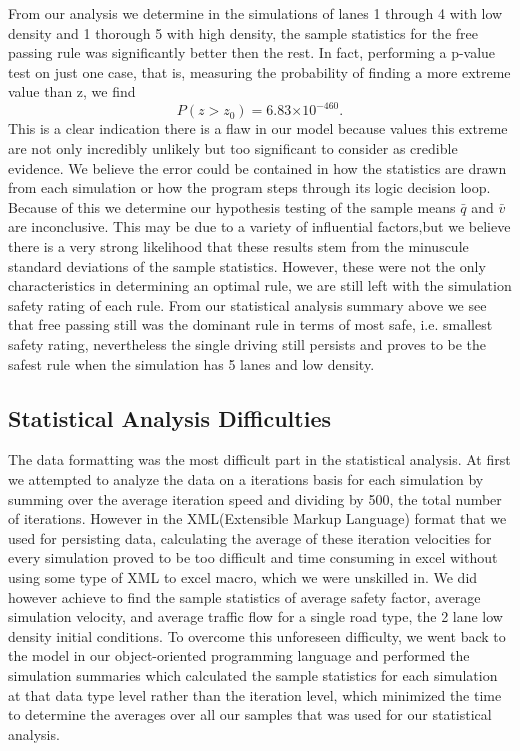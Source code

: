 \documentclass{amsart}
\providecommand{\e}[1]{\ensuremath{\times 10^{#1}}}
\begin{document}
	From our analysis we determine in the simulations of lanes 1 through 4 with low density and 1 thorough 5 with high density, the sample statistics for the free passing rule was significantly better then the rest. In fact, performing a p-value test on just one case, that is, measuring the probability of finding a more extreme value than z, we find 
	\[
		P( z > z_0) = 6.83 \e{-460}.
	\]
	This is a clear indication there is a flaw in our model because values this extreme are not only incredibly unlikely but too significant to consider as credible evidence. We believe the error could be contained in how the statistics are drawn from each simulation or how the program steps through its logic decision loop.  Because of this we determine our hypothesis testing of the sample means $\bar q$ and $\bar v$ are inconclusive. This may be due to a variety of influential factors,but we believe there is a very strong likelihood that these results stem from the minuscule standard deviations of the sample statistics. However, these were not the only characteristics in determining an optimal rule, we are still left with the simulation safety rating of each rule. From our statistical analysis summary above we see that free passing still was the dominant rule in terms of most safe, i.e. smallest safety rating, nevertheless the single driving still persists and proves to be the safest rule when the simulation has 5 lanes and low density.  

	\subsection{Statistical Analysis Difficulties}
	The data formatting was the most difficult part in the statistical analysis. At first we attempted to analyze the data on a iterations basis for each simulation by summing over the average iteration speed and dividing by 500, the total number of iterations. However in the XML(Extensible Markup Language) format that we used for persisting data, calculating the average of these iteration velocities for every simulation proved to be too difficult and time consuming in excel without using some type of XML to excel macro, which we were unskilled in. We did however achieve to find the sample statistics of average safety factor, average simulation velocity, and average traffic flow for a single road type, the 2 lane low density initial conditions. To overcome this unforeseen difficulty, we went back to the model in our object-oriented programming language and performed the simulation summaries which calculated the sample statistics for each simulation at that data type level rather than the iteration level, which minimized the time to determine the averages over all our samples that was used for our statistical analysis.
\end{document}
